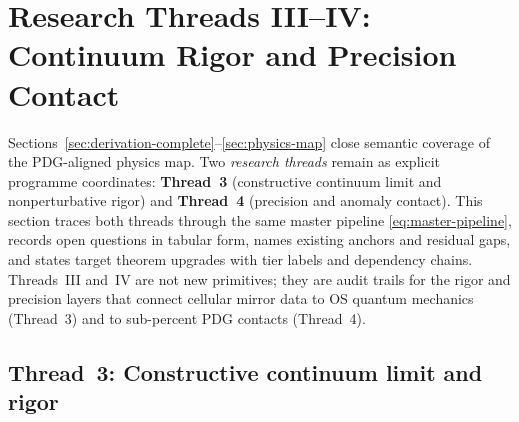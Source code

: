 \section{Research Threads III--IV: Continuum Rigor and Precision Contact}
\label{sec:threads-3-4}

Sections~\ref{sec:derivation-complete}--\ref{sec:physics-map} close semantic
coverage of the PDG-aligned physics map. Two \emph{research threads} remain
as explicit programme coordinates: \textbf{Thread~3} (constructive continuum
limit and nonperturbative rigor) and \textbf{Thread~4} (precision and anomaly
contact). This section traces both threads through the same master pipeline
\eqref{eq:master-pipeline}, records open questions in tabular form, names
existing anchors and residual gaps, and states target theorem upgrades with
tier labels and dependency chains. Threads~III and~IV are not new primitives;
they are audit trails for the rigor and precision layers that connect cellular
mirror data to OS quantum mechanics (Thread~3) and to sub-percent PDG contacts
(Thread~4).

\subsection{Thread~3: Constructive continuum limit and rigor}
\label{sec:thread-3}

